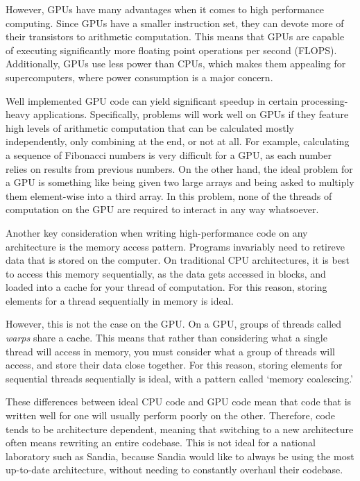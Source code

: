 However, GPUs have
many advantages when it comes to high performance computing. Since GPUs have
a smaller instruction set, they can devote more of their transistors to
arithmetic computation. This means that GPUs are capable of executing
significantly more floating point operations per second (FLOPS). Additionally,
GPUs use less power than CPUs, which makes them appealing for supercomputers,
where power consumption is a major concern.

Well implemented GPU code can yield significant speedup in certain
processing-heavy applications. Specifically, problems will work well on GPUs if they feature high 
levels of arithmetic computation that can be calculated mostly independently, only combining at the end,
or not at all. For example, calculating a sequence of Fibonacci numbers is very difficult for a GPU, as
each number relies on results from previous numbers. On the other hand, the ideal problem for a GPU is something 
like being given two large arrays and being asked to multiply them element-wise into a third array. In this problem,
none of the threads of computation on the GPU are required to interact in any way whatsoever.

Another key consideration when writing high-performance code on any architecture is the memory access pattern.
Programs invariably need to retireve data that is stored on the computer. On traditional CPU architectures, it is
best to access this memory sequentially, as the data gets accessed in blocks, and loaded into a cache for your 
thread of computation. For this reason, storing elements for a thread sequentially in memory is ideal.

However, this is not the case on the GPU. On a GPU, groups of threads called \emph{warps} share a cache. This means that
rather than considering what a single thread will access in memory, you must consider what a group of threads will access,
and store their data close together. For this reason, storing elements for sequential threads sequentially is ideal, with a
pattern called `memory coalescing.'

These differences between ideal CPU code and GPU code mean that code that is written well for one will usually perform poorly 
on the other. Therefore, code tends to be architecture dependent, meaning that switching to a new architecture 
often means rewriting an entire codebase. This is not ideal for a national laboratory such as Sandia, because Sandia would like 
to always be using the most up-to-date architecture, without needing to constantly overhaul their codebase.


